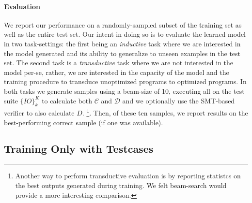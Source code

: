 \documentclass{article}
\begin{document}

\paragraph{Evaluation}

We report our performance on a randomly-sampled subset of the training set as well as the entire test set. Our intent in doing so is to evaluate the learned model in two task-settings: the first being an \textit{inductive} task where we are interested in the model generated and its ability to generalize to unseen examples in the test set. The second task is a \textit{transductive} task where we are not interested in the model per-se, rather, we are interested in the capacity of the model and the training procedure to transduce unoptimized programs to optimized programs. In both tasks we generate samples using a beam-size of 10, executing all on the test suite $\{IO\}_{k}^K$ to calculate both $\mathcal{C}$  and $\mathcal{D}$ and we optionally use the SMT-based verifier to also calculate $D$. \footnote{Another way to perform transductive evaluation is by reporting statistcs on the best outputs generated during training. We felt beam-search would provide a more interesting comparison.}. Then, of these ten samples, we report results on the best-performing correct sample (if one was available). 


\subsection{Training Only with Testcases}

\end{document}
